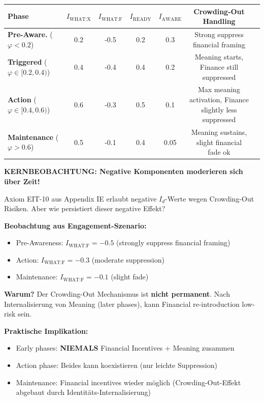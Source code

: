 \begin{center}
\small
\renewcommand{\arraystretch}{1.3}
\begin{tabular}{@{}lcccccc@{}}
\toprule
\textbf{Phase} & $I_{\text{WHAT:X}}$ & $I_{\text{WHAT:F}}$ & $I_{\text{READY}}$ & $I_{\text{AWARE}}$ & \textbf{Crowding-Out Handling} \\
\midrule
\textbf{Pre-Aware.} ($\varphi < 0.2$) & 0.2 & -0.5 & 0.2 & 0.3 & Strong suppress financial framing \\
\textbf{Triggered} ($\varphi \in [0.2, 0.4)$) & 0.4 & -0.4 & 0.4 & 0.2 & Meaning starts, Finance still suppressed \\
\textbf{Action} ($\varphi \in [0.4, 0.6)$) & 0.6 & -0.3 & 0.5 & 0.1 & Max meaning activation, Finance slightly less suppressed \\
\textbf{Maintenance} ($\varphi > 0.6$) & 0.5 & -0.1 & 0.4 & 0.05 & Meaning sustains, slight financial fade ok \\
\bottomrule
\end{tabular}
\end{center}

\textbf{KERNBEOBACHTUNG: Negative Komponenten moderieren sich über Zeit!}

\begin{tcolorbox}[colback=orange!5!white, colframe=orange!75!black, title=\textbf{Axiom-Bezug: EIT-10 über Phasen (Neu!)}]

Axiom EIT-10 aus Appendix IE erlaubt negative $I_d$-Werte wegen Crowding-Out Risiken. Aber wie persistiert dieser negative Effekt?

\textbf{Beobachtung aus Engagement-Szenario:}
\begin{itemize}[nosep]
\item Pre-Awareness: $I_{\text{WHAT:F}} = -0.5$ (strongly suppress financial framing)
\item Action: $I_{\text{WHAT:F}} = -0.3$ (moderate suppression)
\item Maintenance: $I_{\text{WHAT:F}} = -0.1$ (slight fade)
\end{itemize}

\textbf{Warum?} Der Crowding-Out Mechanismus ist \textbf{nicht permanent}. Nach Internalisierung von Meaning (later phases), kann Financial re-introduction low-risk sein.

\textbf{Praktische Implikation:}
\begin{itemize}[nosep]
\item Early phases: \textbf{NIEMALS} Financial Incentives + Meaning zusammen
\item Action phase: Beides kann koexistieren (nur leichte Suppression)
\item Maintenance: Financial incentives wieder möglich (Crowding-Out-Effekt abgebaut durch Identitäts-Internalisierung)
\end{itemize}

\end{tcolorbox}

